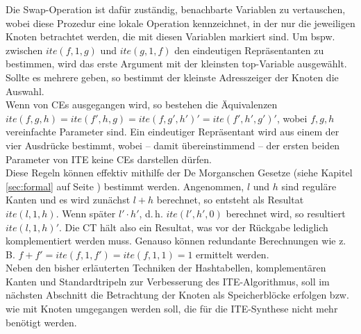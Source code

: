 Die Swap-Operation ist dafür zuständig, benachbarte Variablen zu vertauschen, wobei diese Prozedur eine lokale Operation kennzeichnet, in der nur die jeweiligen Knoten betrachtet werden, die mit diesen Variablen markiert sind. Um bspw. zwischen $ite(f,1,g)$ und $ite(g,1,f)$ den eindeutigen Repräsentanten zu bestimmen, wird das erste Argument mit der kleinsten top-Variable ausgewählt. Sollte es mehrere geben, so bestimmt der kleinste Adresszeiger der Knoten die Auswahl.\\
Wenn von CEs ausgegangen wird, so bestehen die Äquivalenzen \\$ite(f,g,h) = ite(f',h,g)$$= ite(f,g',h')' = ite(f',h',g')'$, wobei $f,g,h$ vereinfachte Parameter sind. Ein eindeutiger Repräsentant wird aus einem der vier Ausdrücke bestimmt, wobei -- damit übereinstimmend -- der ersten beiden Parameter von ITE keine CEs darstellen dürfen.\\
Diese Regeln können effektiv mithilfe der De Morganschen Gesetze (siehe Kapitel \ref{sec:formal} auf Seite \pageref{sec:formal}) bestimmt werden. Angenommen, $l$ und $h$ sind reguläre Kanten und es wird zunächst $l+h$ berechnet, so entsteht als Resultat $ite(l, 1, h)$. Wenn später $l' \cdot h'$, d.\,h. $ite(l',h',0)$ berechnet wird, so resultiert $ite(l,1,h)'$. Die CT hält also ein Resultat, was vor der Rückgabe lediglich komplementiert werden muss. Genauso können redundante Berechnungen wie z.\,B. $f+f' = ite(f,1,f') = ite(f,1,1) = 1$ ermittelt werden.\\
Neben den bisher erläuterten Techniken der Hashtabellen, komplementären Kanten und Standardtripeln zur Verbesserung des ITE-Algorithmus, soll im nächsten Abschnitt die Betrachtung der Knoten als Speicherblöcke erfolgen bzw. wie mit Knoten umgegangen werden soll, die für die ITE-Synthese nicht mehr benötigt werden.

